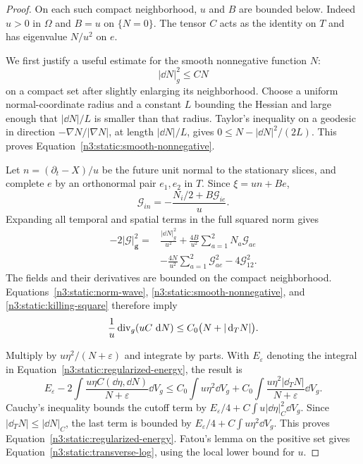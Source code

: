 \begin{proof}
On each such compact neighborhood, \(u\) and \(B\) are bounded below.
Indeed \(u>0\) in \(\Omega\) and \(B=u\) on \(\{N=0\}\).
The tensor \(C\) acts as the identity on \(T\) and has eigenvalue
\(N/u^2\) on \(e\).

We first justify a useful estimate for the smooth nonnegative function
\(N\):
\begin{equation}
\label{n3:static:smooth-nonnegative}
|\dd N|_g^2\leq C N
\end{equation}
on a compact set after slightly enlarging its neighborhood.
Choose a uniform normal-coordinate radius and a constant \(L\)
bounding the Hessian and large enough that
\(|\dd N|/L\) is smaller than that radius.
Taylor's inequality on a geodesic in direction
\(-\nabla N/|\nabla N|\), at length \(|\dd N|/L\), gives
\(0\leq N-|\dd N|^2/(2L)\).
This proves Equation~\eqref{n3:static:smooth-nonnegative}.

Let \(n=(\partial_t-X)/u\) be the future unit normal to the stationary
slices, and complete \(e\) by an orthonormal pair \(e_1,e_2\) in \(T\).
Since \(\xi=un+Be\),
\[
\mathcal G_{in}
=-\frac{N_i/2+B\mathcal G_{ie}}u.
\]
Expanding all temporal and spatial terms in the full squared norm gives
\begin{equation}
\label{n3:static:killing-square}
\begin{aligned}
-2|\mathcal G|_{\mathbf g}^2
={}&\frac{|\dd N|_g^2}{u^2}
 +\frac{4B}{u^2}\sum_{a=1}^2N_a\mathcal G_{ae}\\
&-\frac{4N}{u^2}\sum_{a=1}^2\mathcal G_{ae}^2
 -4\mathcal G_{12}^2.
\end{aligned}
\end{equation}
The fields and their derivatives are bounded on the compact
neighborhood. Equations~\eqref{n3:static:norm-wave},
\eqref{n3:static:smooth-nonnegative}, and \eqref{n3:static:killing-square}
therefore imply
\begin{equation}
\label{n3:static:norm-inequality}
\frac1u\operatorname{div}_g(uC\,\,\mathrm d N)
\leq C_0\bigl(N+|\,\mathrm d_TN|\bigr).
\end{equation}

Multiply by \(u\eta^2/(N+\varepsilon)\) and integrate by parts.
With \(E_\varepsilon\) denoting the integral in
Equation~\eqref{n3:static:regularized-energy}, the result is
\[
E_\varepsilon
-2\int\frac{u\eta C(\dd\eta,\dd N)}{N+\varepsilon}\dd V_g
\leq C_0\int u\eta^2\dd V_g
 +C_0\int\frac{u\eta^2|\dd_TN|}{N+\varepsilon}\dd V_g .
\]
Cauchy's inequality bounds the cutoff term by
\(E_\varepsilon/4+C\int u|\dd\eta|_C^2\dd V_g\).
Since \(|\dd_TN|\leq|\dd N|_C\), the last term is bounded by
\(E_\varepsilon/4+C\int u\eta^2\dd V_g\).
This proves Equation~\eqref{n3:static:regularized-energy}.
Fatou's lemma on the positive set gives
Equation~\eqref{n3:static:transverse-log}, using the local lower bound
for \(u\).
\end{proof}

